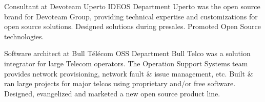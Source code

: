 \documentclass[12pt,a4paper]{moderncv}
\begin{document}
        {\textcolor{subsectioncolor}{Consultant at Devoteam Uperto}}
        {IDEOS Department}{}{}
{Uperto was the open source brand for Devoteam Group, providing technical
  expertise and customizations for open source solutions.}
{Designed solutions during presales. Promoted Open Source technologies.}

        {\textcolor{subsectioncolor}{Software architect at Bull Télécom}}
        {OSS Department}{}{}
{Bull Telco was a solution integrator for large Telecom operators.
  The Operation Support Systems team provides
  network provisioning, network fault \& issue management, etc.}
{Built \& ran large projects for major telcos using proprietary and/or free software.
  Designed, evangelized and marketed a new open source product line.}





\end{document}
